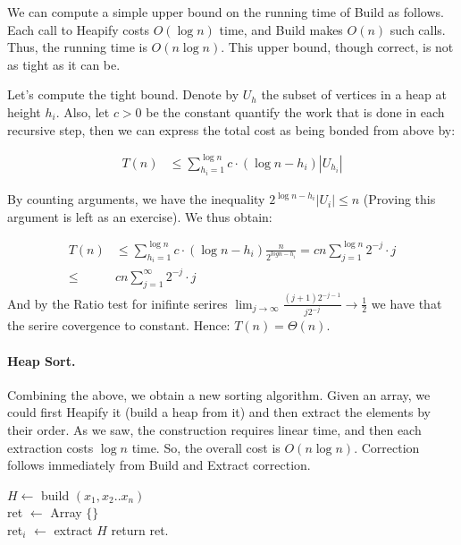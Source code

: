 We can compute a simple upper bound on the running time of Build as follows. Each call to Heapify costs $O(\log n)$ time, and Build makes $O(n)$ such calls. Thus, the running time is $O(n \log n)$. This upper bound, though correct, is not as tight as it can be.

Let's compute the tight bound. Denote by $U_h$ the subset of vertices in a heap at height $h_{i}$. Also, let $c > 0 $ be the constant quantify the work that is done in each recursive step, then we can express the total cost as being bonded from above by: 

\begin{equation*}
  \begin{split}
    T\left( n \right) & \le \sum_{ h_{i} =1}^{ \log n }{c \cdot \left( \log n -  h_{i} \right)  |U_{h_{i}}|   } 
  \end{split}
\end{equation*}

By counting arguments, we have the inequality $ 2^{\log n - h_{i}}|U_{i}| \le n $ (Proving this argument is left as an exercise). We thus obtain:  

\begin{equation*}
  \begin{split}
    T\left( n \right)  & \le  \sum_{ h_{i} =1}^{ \log n }{c \cdot \left( \log n -  h_{i} \right) \frac{n}{2^{log n - h_{i}} }} = c n \sum_{ j = 1}^{ \log n }{ 2^{-j} \cdot j  }  \\ 
      \le &  c n \sum_{ j = 1}^{ \infty }{ 2^{-j} \cdot j  } 
  \end{split}
\end{equation*}
And by the Ratio test for inifinte serires $ \lim_{j\rightarrow \infty} \frac{(j+1)2^{-j-1}}{j2^{-j}} \rightarrow \frac{1}{2}$ we have that the serire covergence to constant. Hence: $ T\left( n \right) = \Theta\left( n \right) $. 


\paragraph{Heap Sort.}   
Combining the above, we obtain a new sorting algorithm. Given an array, we could first Heapify it (build a heap from it) and then extract the elements by their order. As we saw, the construction requires linear time, and then each extraction costs $\log n$ time. So, the overall cost is $O\left( n\log n  \right)$. Correction follows immediately from Build and Extract correction.  

\begin{algorithm}[H]
  $H \leftarrow $ build $ \left( x_1, x_2 .. x_{n}  \right) $ \\ 
  ret $ \leftarrow $ Array $ \{ \} $ \\
   {
  ret$_{i}$ $\leftarrow$ extract $H$
  }
  return ret. 
\end{algorithm}


